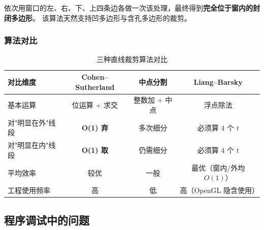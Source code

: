 \documentclass[a4paper,12pt]{ctexart}
\begin{document}
依次用窗口的左、右、下、上四条边各做一次该处理，最终得到\textbf{完全位于窗内的封闭多边形}。
该算法天然支持凹多边形与含孔多边形的裁剪。

\subsubsection{算法对比}

\begin{table}[H]
\centering
\renewcommand{\arraystretch}{1.3}
\begin{tabular}{lccc}
\toprule
对比维度       & Cohen–Sutherland & 中点分割 & Liang–Barsky \\
\midrule
基本运算   & 位运算 + 求交 & 整数加 + 中点 & 浮点除法 \\
对"明显在外"线段 & \textbf{O(1) 弃} & 多次细分 & 必须算 4 个 $t$ \\
对"明显在内"线段 & \textbf{O(1) 取} & 仍需细分 & 必须算 4 个 $t$ \\
平均效率   & 较优 & 一般 & 最优（窗内/外均 $O(1)$） \\
工程使用频率 & 高 & 低 & 高（OpenGL 隐含使用） \\
\bottomrule
\end{tabular}
\caption{三种直线裁剪算法对比}
\end{table}

\subsection{程序调试中的问题}
\end{document}
